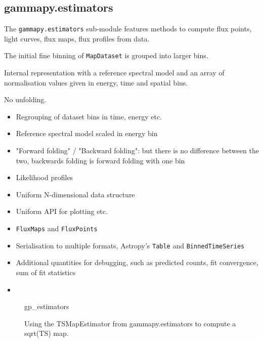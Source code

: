 \subsection{gammapy.estimators}
\label{ssec:gammapy-estimators}
The \verb|gammapy.estimators| sub-module features methods to compute
flux points, light curves, flux maps, flux profiles from data.

The initial fine binning of \verb|MapDataset| is grouped into larger bins.

Internal representation with a reference spectral model and an array of
normalisation values given in energy, time and spatial bins.

No unfolding.

\begin{itemize}
	\item Regrouping of dataset bins in time, energy etc.
	\item Reference spectral model scaled in energy bin
	\item "Forward folding" / "Backward folding": but there is no difference between the two, backwards folding is forward folding with one bin
	\item Likelihood profiles
	\item Uniform N-dimensional data structure
	\item Uniform API for plotting etc.
	\item \verb|FluxMaps| and \verb|FluxPoints|
	\item Serialisation to multiple formats, Astropy's \verb|Table| and \verb|BinnedTimeSeries|
	\item Additional quantities for debugging, such as predicted counts, fit convergence, sum of fit statistics
	\item
\end{itemize}

\begin{figure}
	{gp_estimators}
	\caption{Using the TSMapEstimator from gammapy.estimators to compute a sqrt(TS) map.}
	\label{fig*:minted:gp_estimators}
\end{figure}

